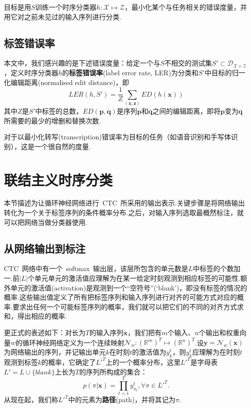\documentclass{ctexart}
\def\bR{\mathbb{R}}
\def\cD{\mathcal{D}}
\def\cN{\mathcal{N}}
\def\cX{\mathcal{X}}
\def\cZ{\mathcal{Z}}
\def\vx{\mathbf{x}}
\def\vy{\mathbf{y}}
\def\vz{\mathbf{z}}
\def\vp{\mathbf{p}}
\def\vq{\mathbf{q}}
\begin{document}
目标是用$S$训练一个时序分类器$h:\cX\mapsto\cZ$，最小化某个与任务相关的错误度量，并用它对之前未见过的输入序列进行分类.
\subsection{标签错误率}
\label{sec:ler}
本文中，我们感兴趣的是下述错误度量：给定一个与$S$不相交的测试集$S'\subset\cD_{\cX\times\cZ}$，定义时序分类器$h$的\textbf{标签错误率}(label error rate, LER)为分类和$S'$中目标的归一化编辑距离(normalised edit distance)，即
\begin{equation}
	\textit{LER}(h, S') = \frac 1Z \sum_{(\vx, \vz)} \textit{ED}(h(\vx))
\end{equation}
其中$Z$是$S'$中标签的总数，$\textit{ED}(\vp,\vq)$是序列$\vp$和$\vq$之间的编辑距离，即将$\vp$变为$\vq$所需要的最少的增删和替换次数.

对于以最小化转写(transcription)错误率为目标的任务（如语音识别和手写体识别），这是一个很自然的度量.
\section{联结主义时序分类}
\label{sec:ctc}
本节描述为让循环神经网络进行~CTC~所采用的输出表示.关键步骤是将网络输出转化为一个关于标签序列的条件概率分布.之后，对输入序列选取最概然标注，就可以把网络当做分类器使用.
\subsection{从网络输出到标注}
CTC~网络中有一个~softmax~输出层\citep{bridle1990probabilistic}，该层所包含的单元数是$L$中标签的个数加一.前$|L|$个单元单元的激活值应理解为在某一给定时刻观测到相应标签的可能性.额外单元的激活值(activation)是观测到一个“空符号”(`blank')，即没有标签的情况的概率.这些输出值定义了所有把标签序列和输入序列进行对齐的可能方式对应的概率.要求出任何一个可能标签序列的概率，我们就可以把它们的不同的对齐方式求和，得出相应的概率.

更正式的表述如下：对长为$T$的输入序列$\vx$，我们把有$m$个输入、$n$个输出和权重向量$w$的循环神经网络定义为一个连续映射$\cN_w:(\bR^m)^T\mapsto (\bR^n)^T$.设$\vy = \cN_w(\vx)$为网络输出的序列，并记输出单元$k$在时刻$t$的激活值为$y_k^t$，则$y_k^t$应理解为在时刻$t$观测到标签$k$的概率，它确定了$L'^T$上的一个概率分布，这里$L'^T$是字母表$L'=L\cup\{\textit{blank}\}$上长为$T$的序列所构成的集合：
\begin{equation}
	\label{eq:2}
	p(\pi|\vx) = \prod_{t=1}^{T} y_{\pi_t}^t, \forall\pi\in L'^T.
\end{equation}
从现在起，我们称$L'^T$中的元素为\textbf{路径}(path)，并将其记为$\pi$.
\end{document}
